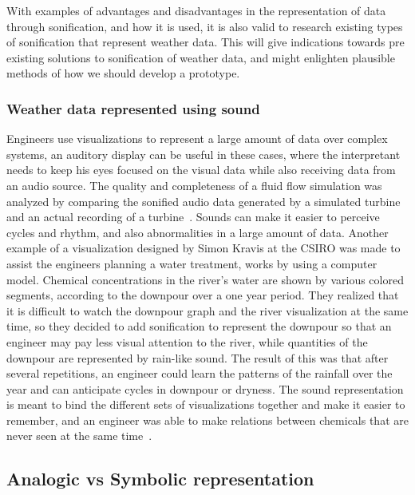 With examples of advantages and disadvantages in the representation of data through sonification, and how it is used, it is also valid to research existing types of sonification that represent weather data. 
This will give indications towards pre existing solutions to sonification of weather data, and might enlighten plausible methods of how we should develop a prototype.


\subsubsection{Weather data represented using sound} %
\label{ssub:weather_data_represented_using_sound}

Engineers use visualizations to represent a large amount of data over complex systems, an auditory display can be useful in these cases, where the interpretant needs to keep his eyes focused on the visual data while also receiving data from an audio source. 
The quality and completeness of a fluid flow simulation was analyzed by comparing the sonified audio data generated by a simulated turbine and an actual recording of a turbine~\cite[Ch. 2]{Barrass1999}.
Sounds can make it easier to perceive cycles and rhythm, and also abnormalities in a large amount of data. 
Another example of a visualization designed by Simon Kravis at the CSIRO was made to assist the engineers planning a water treatment, works by using a computer model. 
Chemical concentrations in the river’s water are shown by various colored segments, according to the downpour over a one year period. 
They realized that it is difficult to watch the downpour graph and the river visualization at the same time, so they decided to add sonification to represent the downpour so that an engineer may pay less visual attention to the river, while quantities of the downpour are represented by rain-like sound. 
The result of this was that after several repetitions, an engineer could learn the patterns of the rainfall over the year and can anticipate cycles in downpour or dryness. 
The sound representation is meant to bind the different sets of visualizations together and make it easier to remember, and an engineer was able to make relations between chemicals that are never seen at the same time~\cite{Barrass1998}.



\FloatBarrier
\subsection{Analogic vs Symbolic representation} %
\label{sub:analogic_vs_symbolic_representation}

